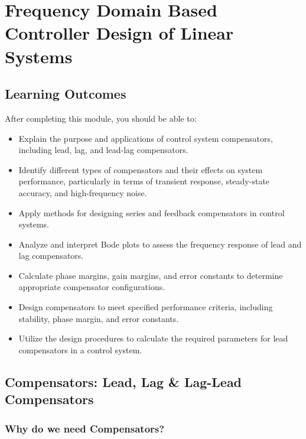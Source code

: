 \documentclass[
  14pt,
  a4paper,
  oneside,
  open=any,
  a4paper,
  14pt]{report}
\begin{document}
\chapter{Frequency Domain Based Controller Design of Linear
Systems}\label{frequency-domain-based-controller-design-of-linear-systems}

\section*{Learning Outcomes}\label{learning-outcomes-9}


After completing this module, you should be able to:

\begin{itemize}
\item
  Explain the purpose and applications of control system compensators,
  including lead, lag, and lead-lag compensators.
\item
  Identify different types of compensators and their effects on system
  performance, particularly in terms of transient response, steady-state
  accuracy, and high-frequency noise.
\item
  Apply methods for designing series and feedback compensators in
  control systems.
\item
  Analyze and interpret Bode plots to assess the frequency response of
  lead and lag compensators.
\item
  Calculate phase margins, gain margins, and error constants to
  determine appropriate compensator configurations.
\item
  Design compensators to meet specified performance criteria, including
  stability, phase margin, and error constants.
\item
  Utilize the design procedures to calculate the required parameters for
  lead compensators in a control system.
\end{itemize}

\section{Compensators: Lead, Lag \& Lag-Lead
Compensators}\label{compensators-lead-lag-lag-lead-compensators}

\subsection{Why do we need
Compensators?}\label{why-do-we-need-compensators}
\end{document}
